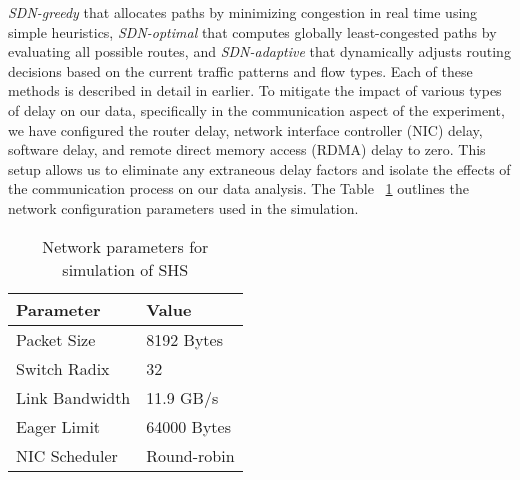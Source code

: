{\em SDN-greedy} that allocates paths by minimizing congestion in real time using simple heuristics, 
{\em SDN-optimal} that computes globally least-congested paths by evaluating all possible routes, and {\em SDN-adaptive} that dynamically adjusts
routing decisions based on the current traffic patterns and flow types.
Each of these methods is described in detail in earlier. 
To mitigate the impact of various types of delay on our data, specifically in 
the communication aspect of the experiment, we have configured the router 
delay, network interface controller (NIC) delay, software delay, and remote 
direct memory access (RDMA) delay to zero. This setup allows us to eliminate 
any extraneous delay factors and isolate the effects of the communication 
process on our data analysis.
The
Table ~\ref{tab:params.1} outlines the network configuration parameters used in the simulation.

\begin{table}[!htbp]
\centering
\caption{Network parameters for simulation of SHS}
\label{tab:params.1}
\vspace{1em}
\begin{tabular}{ll}
\toprule
Parameter & Value \\
\midrule
Packet Size     & 8192 Bytes \\
Switch Radix    & 32 \\
Link Bandwidth  & 11.9 GB/s \\
Eager Limit     & 64000 Bytes \\
NIC Scheduler   & Round-robin \\
\bottomrule
\end{tabular}
\end{table}
